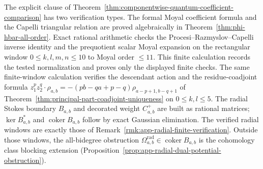 \documentclass[11pt]{memoir}
\begin{document}
\begin{rmk}\label{rmk:computer-verification}
  The explicit clause of
  Theorem~\ref{thm:componentwise-quantum-coefficient-comparison} has two
  verification types.  The formal Moyal coefficient formula and the
  Capelli triangular relation are proved algebraically in
  Theorem~\ref{thm:phi-hbar-all-order}.  Exact rational arithmetic checks
  the Procesi--Razmyslov--Capelli inverse identity and the prequotient
  scalar Moyal expansion on the rectangular window
  \(0\le k,l,m,n\le 10\) to Moyal order \(\le 11\).  This finite
  calculation records the tested normalization and proves only the
  displayed finite checks.  The same finite-window
  calculation verifies the descendant action and the residue-coadjoint formula
  \(z_1^pz_2^q\!\cdot\!\rho_{a,b}=-(pb-qa+p-q)\rho_{a-p+1,b-q+1}\) of
  Theorem~\ref{thm:principal-part-coadjoint-uniqueness} on
  \(0\le k,l\le 5\).  The radial Stokes boundary
  \(B_{a,b}\) and decorated weight \(C^+_{a,b}\) are built as
  rational matrices; \(\ker B_{a,b}^*\) and
  \(\operatorname{coker}B_{a,b}\) follow by exact Gaussian elimination.
  The verified radial windows are exactly those of
  Remark~\ref{rmk:app-radial-finite-verification}.  Outside those
  windows, the all-bidegree obstruction
  \(\Omega^{\mathrm{rad}}_{a,b}\in\operatorname{coker}B_{a,b}\) is the
  cohomology class blocking extension
  (Proposition~\ref{prop:app-radial-dual-potential-obstruction}).
\end{rmk}
\end{document}

